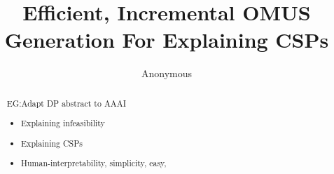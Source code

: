 \documentclass[letterpaper]{article} %
\title{Efficient, Incremental OMUS Generation For Explaining CSPs}
\author{Anonymous}
\newcommand\comment[1]{\marginpar{\tiny #1}}
\renewcommand\comment[1]{#1}
\newcommand{\emilio}[1]{{\comment{\color{orange}\textsc{EG:}#1}}}
\begin{document}
\maketitle

\begin{abstract}
    \emilio{Adapt DP abstract to AAAI
    \begin{itemize}
        \item Explaining infeasibility
        \item Explaining CSPs
        \item Human-interpretability, simplicity, easy,
    \end{itemize}
    }


\end{abstract}
\end{document}
